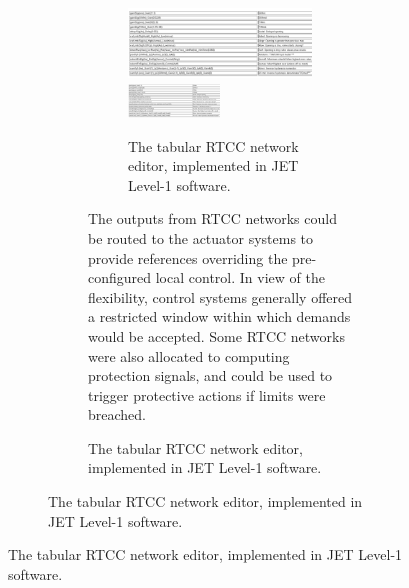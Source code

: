 \documentclass[preprint]{elsarticle}
\begin{document}
\begin{figure}[!p]
\begin{figure}[p]
\ifpreprint
\begin{figure}[p]
\else
\begin{figure}[ht!]
\fi
\centering
\ifpreprint
\includegraphics[width=1.0\textwidth]{L1RTCC.PNG}
\else
\includegraphics[width=0.5\textwidth]{L1RTCC.PNG}
\fi
\caption{The tabular RTCC network editor, implemented in JET Level-1 software.}\label{fig:editor}
\end{figure}


%

The outputs from RTCC networks could be routed to the actuator systems
to provide references overriding the pre-configured local control.
In view of the flexibility, control systems generally offered a restricted
window within which demands would be accepted.
Some RTCC networks were also allocated to computing protection signals,
and could be used to trigger protective actions if limits were breached.


\end{figure}
\end{figure}
\end{figure}
\end{document}

